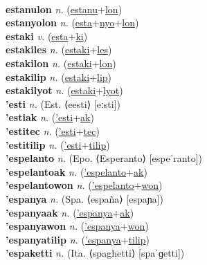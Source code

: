  \label{estanules} \\
\textbf{estanulon} \textit{n.} (\hyperref[estanu]{estanu}+\hyperref[lon]{lon})
 \label{estanulon} \\
\textbf{estanyolon} \textit{n.} (\hyperref[esta]{esta}+\hyperref[nyo]{nyo}+\hyperref[lon]{lon})
 \label{estanyolon} \\
\textbf{estaki} \textit{v.} (\hyperref[esta]{esta}+\hyperref[ki]{ki})
 \label{estaki} \\
\textbf{estakiles} \textit{n.} (\hyperref[estaki]{estaki}+\hyperref[les]{les})
 \label{estakiles} \\
\textbf{estakilon} \textit{n.} (\hyperref[estaki]{estaki}+\hyperref[lon]{lon})
 \label{estakilon} \\
\textbf{estakilip} \textit{n.} (\hyperref[estaki]{estaki}+\hyperref[lip]{lip})
 \label{estakilip} \\
\textbf{estakilyot} \textit{n.} (\hyperref[estaki]{estaki}+\hyperref[lyot]{lyot})
 \label{estakilyot} \\
\textbf{'esti} \textit{n.} (Est. ⟨eesti⟩ [eːsti])
 \label{'esti} \\
\textbf{'estiak} \textit{n.} (\hyperref['esti]{'esti}+\hyperref[ak]{ak})
 \label{'estiak} \\
\textbf{'estitec} \textit{n.} (\hyperref['esti]{'esti}+\hyperref[tec]{tec})
 \label{'estitec} \\
\textbf{'estitilip} \textit{n.} (\hyperref['esti]{'esti}+\hyperref[tilip]{tilip})
 \label{'estitilip} \\
\textbf{'espelanto} \textit{n.} (Epo. ⟨Esperanto⟩ [espeˈranto])
 \label{'espelanto} \\
\textbf{'espelantoak} \textit{n.} (\hyperref['espelanto]{'espelanto}+\hyperref[ak]{ak})
 \label{'espelantoak} \\
\textbf{'espelantowon} \textit{n.} (\hyperref['espelanto]{'espelanto}+\hyperref[won]{won})
 \label{'espelantowon} \\
\textbf{'espanya} \textit{n.} (Spa. ⟨españa⟩ [espaɲa])
 \label{'espanya} \\
\textbf{'espanyaak} \textit{n.} (\hyperref['espanya]{'espanya}+\hyperref[ak]{ak})
 \label{'espanyaak} \\
\textbf{'espanyawon} \textit{n.} (\hyperref['espanya]{'espanya}+\hyperref[won]{won})
 \label{'espanyawon} \\
\textbf{'espanyatilip} \textit{n.} (\hyperref['espanya]{'espanya}+\hyperref[tilip]{tilip})
 \label{'espanyatilip} \\
\textbf{'espaketti} \textit{n.} (Ita. ⟨spaghetti⟩ [spaˈɡetti])
